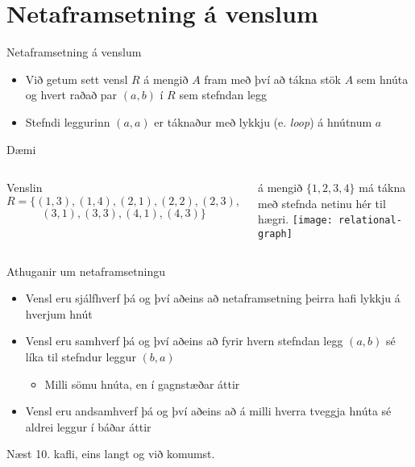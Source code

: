 \documentclass{beamer}
\begin{document}
\section{Netaframsetning á venslum}

\begin{frame}{Netaframsetning á venslum}
\begin{itemize}
 \item Við getum sett vensl $R$ á mengið $A$ fram með því að tákna stök $A$ sem hnúta og hvert raðað par $(a, b)$ í $R$ sem stefndan legg
 \item Stefndi leggurinn $(a, a)$ er táknaður með lykkju (e. \emph{loop}) á hnútnum $a$
\end{itemize}
\end{frame}

\begin{frame}{Dæmi}
\begin{columns}
Venslin
\[
 R = \{(1, 3), (1, 4), (2, 1), (2, 2), (2, 3),
\]
\[
 (3, 1), (3, 3), (4, 1), (4, 3)\}
\]

á mengið $\{1, 2, 3, 4\}$ má tákna með stefnda netinu hér til hægri.
\texttt{[image: relational-graph]}
\end{columns}
\end{frame}

\begin{frame}{Athuganir um netaframsetningu}
\begin{itemize}
 \item Vensl eru sjálfhverf þá og því aðeins að netaframsetning þeirra hafi lykkju á hverjum hnút
 \item Vensl eru samhverf þá og því aðeins að fyrir hvern stefndan legg $(a,b)$ sé líka til stefndur leggur $(b, a)$
 \begin{itemize}
  \item Milli sömu hnúta, en í gagnstæðar áttir
 \end{itemize}
 \item Vensl eru andsamhverf þá og því aðeins að á milli hverra tveggja hnúta sé aldrei leggur í báðar áttir
\end{itemize}

\end{frame}



\begin{frame}{Næst}
10. kafli, eins langt og við komumst.
\end{frame}
\end{document}
